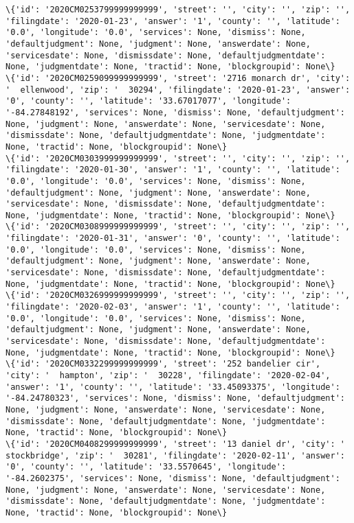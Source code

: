 \documentclass[11pt]{article}
\begin{document}
\begin{Verbatim}[commandchars=\\\{\}]
\{'id': '2020CM0253799999999999', 'street': '', 'city': '', 'zip': '', 'filingdate': '2020-01-23', 'answer': '1', 'county': '', 'latitude': '0.0', 'longitude': '0.0', 'services': None, 'dismiss': None, 'defaultjudgment': None, 'judgment': None, 'answerdate': None, 'servicesdate': None, 'dismissdate': None, 'defaultjudgmentdate': None, 'judgmentdate': None, 'tractid': None, 'blockgroupid': None\}
\{'id': '2020CM0259099999999999', 'street': '2716 monarch dr', 'city': '  ellenwood', 'zip': '  30294', 'filingdate': '2020-01-23', 'answer': '0', 'county': '', 'latitude': '33.67017077', 'longitude': '-84.27848192', 'services': None, 'dismiss': None, 'defaultjudgment': None, 'judgment': None, 'answerdate': None, 'servicesdate': None, 'dismissdate': None, 'defaultjudgmentdate': None, 'judgmentdate': None, 'tractid': None, 'blockgroupid': None\}
\{'id': '2020CM0303999999999999', 'street': '', 'city': '', 'zip': '', 'filingdate': '2020-01-30', 'answer': '1', 'county': '', 'latitude': '0.0', 'longitude': '0.0', 'services': None, 'dismiss': None, 'defaultjudgment': None, 'judgment': None, 'answerdate': None, 'servicesdate': None, 'dismissdate': None, 'defaultjudgmentdate': None, 'judgmentdate': None, 'tractid': None, 'blockgroupid': None\}
\{'id': '2020CM0308999999999999', 'street': '', 'city': '', 'zip': '', 'filingdate': '2020-01-31', 'answer': '0', 'county': '', 'latitude': '0.0', 'longitude': '0.0', 'services': None, 'dismiss': None, 'defaultjudgment': None, 'judgment': None, 'answerdate': None, 'servicesdate': None, 'dismissdate': None, 'defaultjudgmentdate': None, 'judgmentdate': None, 'tractid': None, 'blockgroupid': None\}
\{'id': '2020CM0326999999999999', 'street': '', 'city': '', 'zip': '', 'filingdate': '2020-02-03', 'answer': '1', 'county': '', 'latitude': '0.0', 'longitude': '0.0', 'services': None, 'dismiss': None, 'defaultjudgment': None, 'judgment': None, 'answerdate': None, 'servicesdate': None, 'dismissdate': None, 'defaultjudgmentdate': None, 'judgmentdate': None, 'tractid': None, 'blockgroupid': None\}
\{'id': '2020CM0332299999999999', 'street': '252 bandelier cir', 'city': '  hampton', 'zip': '  30228', 'filingdate': '2020-02-04', 'answer': '1', 'county': '', 'latitude': '33.45093375', 'longitude': '-84.24780323', 'services': None, 'dismiss': None, 'defaultjudgment': None, 'judgment': None, 'answerdate': None, 'servicesdate': None, 'dismissdate': None, 'defaultjudgmentdate': None, 'judgmentdate': None, 'tractid': None, 'blockgroupid': None\}
\{'id': '2020CM0408299999999999', 'street': '13 daniel dr', 'city': '  stockbridge', 'zip': '  30281', 'filingdate': '2020-02-11', 'answer': '0', 'county': '', 'latitude': '33.5570645', 'longitude': '-84.2602375', 'services': None, 'dismiss': None, 'defaultjudgment': None, 'judgment': None, 'answerdate': None, 'servicesdate': None, 'dismissdate': None, 'defaultjudgmentdate': None, 'judgmentdate': None, 'tractid': None, 'blockgroupid': None\}

\end{Verbatim}
\end{document}
